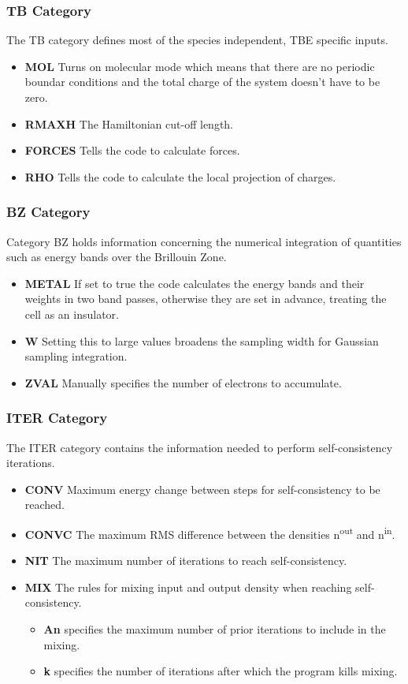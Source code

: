 \documentclass{article}
\begin{document}
\begin{multicols}{2}
\subsubsection{TB Category} The TB category defines most of the species independent, TBE specific inputs.
\begin{itemize}
	\item \textbf{MOL} Turns on molecular mode which means that there are no periodic boundar conditions and the total charge of the system doesn't have to be zero.
	\item \textbf{RMAXH} The Hamiltonian cut-off length.
	\item \textbf{FORCES} Tells the code to calculate forces.
	\item \textbf{RHO} Tells the code to calculate the local projection of charges.
\end{itemize}
\subsubsection{BZ Category} Category BZ holds information concerning the numerical integration of quantities such as energy bands over the Brillouin Zone.
\begin{itemize}
	\item \textbf{METAL} If set to true the code calculates the energy bands and their weights in two band passes, otherwise they are set in advance, treating the cell as an insulator.
	\item \textbf{W} Setting this to large values broadens the sampling width for Gaussian sampling integration.
	\item \textbf{ZVAL} Manually specifies the number of electrons to accumulate.
\end{itemize}
\subsubsection{ITER Category}
\label{sec:ITER} 
The ITER category contains the information needed to perform self-consistency iterations.
\begin{itemize}
	\item{\textbf{CONV} Maximum energy change between steps for self-consistency to be reached.}
	\item{\textbf{CONVC} The maximum RMS difference between the densities n\textsuperscript{out} and n\textsuperscript{in}.}
	\item{\textbf{NIT} The maximum number of iterations to reach self-consistency.}
	\item\textbf{MIX} The rules for mixing input and output density when reaching self-consistency.
	\begin{itemize}
		\item \textbf{An} specifies the maximum number of prior iterations to include in the mixing.
		\item \textbf{k} specifies the number of iterations after which the program kills mixing.
	\end{itemize}
\end{itemize}

\end{multicols}
\end{document}
